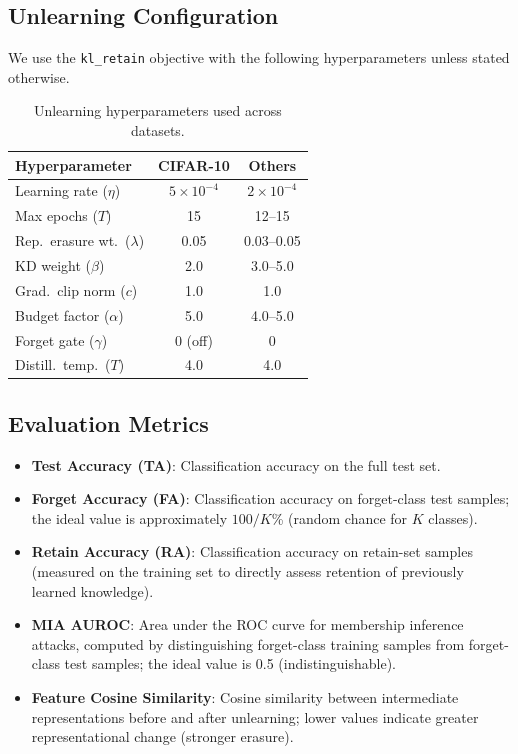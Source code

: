 \documentclass{article}
\newcommand{\klr}{\texttt{kl\_retain}}
\begin{document}
\subsection{Unlearning Configuration}

We use the \klr{} objective with the following hyperparameters unless stated otherwise.

\begin{table}[t]
\centering
\small
\begin{tabular}{lcc}
\toprule
\textbf{Hyperparameter} & \textbf{CIFAR-10} & \textbf{Others} \\
\midrule
Learning rate ($\eta$) & $5 \times 10^{-4}$ & $2 \times 10^{-4}$ \\
Max epochs ($T$) & 15 & 12--15 \\
Rep.\ erasure wt.\ ($\lambda$) & 0.05 & 0.03--0.05 \\
KD weight ($\beta$) & 2.0 & 3.0--5.0 \\
Grad.\ clip norm ($c$) & 1.0 & 1.0 \\
Budget factor ($\alpha$) & 5.0 & 4.0--5.0 \\
Forget gate ($\gamma$) & 0 (off) & 0 \\
Distill.\ temp.\ ($T$) & 4.0 & 4.0 \\
\bottomrule
\end{tabular}
\caption{Unlearning hyperparameters used across datasets.}\label{tab:hyperparams_main}
\end{table}

\subsection{Evaluation Metrics}

\begin{itemize}[nosep,leftmargin=*]
  \item \textbf{Test Accuracy (TA)}: Classification accuracy on the full test set.
  
  \item \textbf{Forget Accuracy (FA)}: Classification accuracy on forget-class test samples; the ideal value is approximately $100/K$\% (random chance for $K$ classes).
  
  \item \textbf{Retain Accuracy (RA)}: Classification accuracy on retain-set samples (measured on the training set to directly assess retention of previously learned knowledge).
  
  \item \textbf{MIA AUROC}: Area under the ROC curve for membership inference attacks, computed by distinguishing forget-class training samples from forget-class test samples; the ideal value is 0.5 (indistinguishable).
  
  \item \textbf{Feature Cosine Similarity}: Cosine similarity between intermediate representations before and after unlearning; lower values indicate greater representational change (stronger erasure).
\end{itemize}
\end{document}
